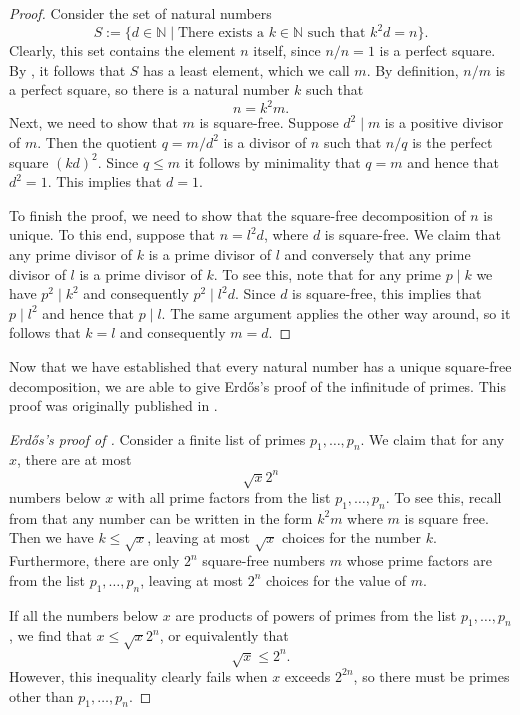\begin{proof}
  Consider the set of natural numbers
  \begin{equation*}
    S := \{d\in\mathbb{N}\mid\text{There exists a $k\in\mathbb{N}$ such that $k^2d=n$}\}.
  \end{equation*}
  Clearly, this set contains the element $n$ itself, since $n/n=1$ is a perfect square. By , it follows that $S$ has a least element, which we call $m$. By definition, $n/m$ is a perfect square, so there is a natural number $k$ such that
  \begin{equation*}
    n=k^2m.
  \end{equation*}
  Next, we need to show that $m$ is square-free. Suppose $d^2\mid m$ is a positive divisor of $m$. Then the quotient $q=m/d^2$ is a divisor of $n$ such that $n/q$ is the perfect square $(kd)^2$. Since $q\leq m$ it follows by minimality that $q=m$ and hence that $d^2=1$. This implies that $d=1$.

  To finish the proof, we need to show that the square-free decomposition of $n$ is unique. To this end, suppose that $n=l^2d$, where $d$ is square-free. We claim that any prime divisor of $k$ is a prime divisor of $l$ and conversely that any prime divisor of $l$ is a prime divisor of $k$. To see this, note that for any prime $p\mid k$ we have $p^2\mid k^2$ and consequently $p^2\mid l^2d$. Since $d$ is square-free, this implies that $p\mid l^2$ and hence that $p\mid l$. The same argument applies the other way around, so it follows that $k=l$ and consequently $m=d$.
\end{proof}

Now that we have established that every natural number has a unique square-free decomposition, we are able to give Erd\H{o}s's proof of the infinitude of primes. This proof was originally published in \cite{erdos1938}.

\begin{proof}[Erd\H{o}s's proof of ]
  Consider a finite list of primes $p_1,\ldots,p_n$. We claim that for any $x$, there are at most
  \begin{equation*}
    \sqrt{x}2^n
  \end{equation*}
  numbers below $x$ with all prime factors from the list $p_1,\ldots,p_n$. To see this, recall from  that any number can be written in the form $k^2m$ where $m$ is square free. Then we have $k\leq\sqrt{x}$, leaving at most $\sqrt{x}$ choices for the number $k$. Furthermore, there are only $2^n$ square-free numbers $m$ whose prime factors are from the list $p_1,\ldots,p_n$, leaving at most $2^n$ choices for the value of $m$.
  
  If all the numbers below $x$ are products of powers of primes from the list $p_1,\ldots,p_n$, we find that $x\leq\sqrt{x}2^n$, or equivalently that
  \begin{equation*}
    \sqrt{x}\leq 2^n.
  \end{equation*}
  However, this inequality clearly fails when $x$ exceeds $2^{2n}$, so there must be primes other than $p_1,\ldots,p_n$.
\end{proof}

